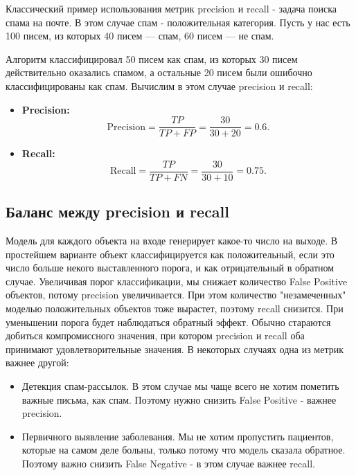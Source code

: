 Классический пример использования метрик precision и recall - задача поиска спама на почте. В этом случае спам - положительная категория. Пусть у нас есть 100 писем, из которых 40 писем — спам, 60 писем — не спам.

Алгоритм классифицировал 50 писем как спам, из которых 30 писем действительно оказались спамом, а остальные 20 писем были ошибочно классифицированы как спам. Вычислим в этом случае precision и recall:

\begin{itemize}
    \item \textbf{Precision:}
          \[
              \text{Precision} = \frac{TP}{TP + FP} = \frac{30}{30 + 20} = 0.6.
          \]

    \item \textbf{Recall:}
          \[
              \text{Recall} = \frac{TP}{TP + FN} = \frac{30}{30 + 10} = 0.75.
          \]
\end{itemize}

\subsection*{Баланс между precision и recall}

Модель для каждого объекта на входе генерирует какое-то число на выходе. В простейшем варианте объект классифицируется как положительный, если это число больше некого выставленного порога, и как отрицательный в обратном случае. Увеличивая порог классификации, мы снижает количество False Positive объектов, потому precision увеличивается. При этом количество "незамеченных" моделью положительных объектов тоже вырастет, поэтому recall снизится. При уменьшении порога будет наблюдаться обратный эффект. Обычно стараются добиться компромиссного значения, при котором precision и recall оба принимают удовлетворительные значения. В некоторых случаях одна из метрик важнее другой:

\begin{itemize}
    \item Детекция спам-рассылок. В этом случае мы чаще всего не хотим пометить важные письма, как спам. Поэтому нужно снизить False Positive - важнее precision.
    \item Первичного выявление заболевания. Мы не хотим пропустить пациентов, которые на самом деле больны, только потому что модель сказала обратное. Поэтому важно снизить False Negative - в этом случае важнее recall.
\end{itemize}


